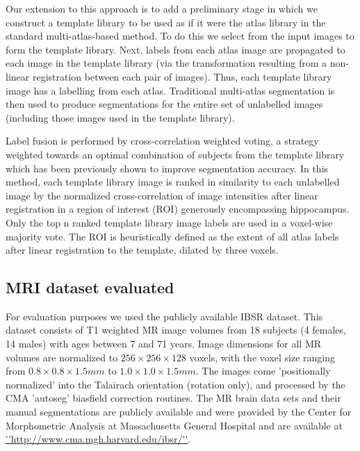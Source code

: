 \documentclass{article}
\begin{document}
Our extension to this approach is to add a preliminary stage in which we
construct a template library to be used as if it were the atlas library
in the standard multi-atlas-based method.  To do this we select from the
input images to form the template library.  Next, labels from each atlas
image are propagated to each image in the template library (via the
transformation resulting from a non-linear registration between each pair
of images).  Thus, each template library image has a labelling from each
atlas.  Traditional multi-atlas segmentation is then used to produce
segmentations for the entire set of unlabelled images (including those
images used in the template library). 

Label fusion is performed by cross-correlation weighted voting, a strategy
weighted towards an optimal combination of subjects from the template library
which has been previously shown to improve segmentation
accuracy\cite{Aljabar2009,Collins2010}. In this method, each template library
image is ranked in similarity to each unlabelled image by the normalized
cross-correlation of image intensities after linear registration in a region of
interest (ROI) generously encompassing hippocampus.  Only the top n ranked
template library image labels are used in a voxel-wise majority vote. The ROI
is heuristically defined as the extent of all atlas labels after linear
registration to the template, dilated by three voxels\cite{Chakravarty2012}.

\subsection{MRI dataset evaluated}

For evaluation purposes we used the publicly available IBSR dataset.  This
dataset consists of T1 weighted MR image volumes from 18 subjects (4 females,
14 males) with ages between 7 and 71 years. Image dimensions for all MR volumes
are normalized to  $256  \times 256 \times 128$ voxels, with the voxel size
ranging from $0.8 \times 0.8 \times 1.5 mm$ to $1.0 \times 1.0 \times 1.5 mm$.
The images come 'positionally normalized' into the Talairach orientation
(rotation only), and processed by the CMA 'autoseg' biasfield correction
routines. The MR brain data sets and their manual segmentations are publicly
available and were provided by the Center for Morphometric Analysis at
Massachusetts General Hospital and are available at
\url{''http://www.cma.mgh.harvard.edu/ibsr/''}. 
\end{document}
